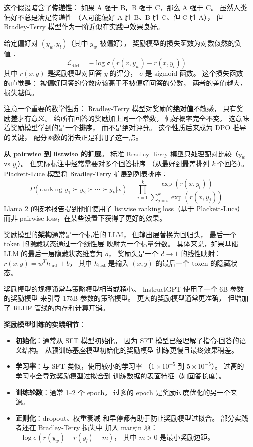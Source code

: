 这个假设暗含了\textbf{传递性}：
如果 A 强于 B，B 强于 C，那么 A 强于 C。
虽然人类偏好不总是满足传递性
（人可能偏好 A 胜 B、B 胜 C、但 C 胜 A），
但 Bradley-Terry 模型作为一阶近似在实践中效果良好。

给定偏好对 $(y_w, y_l)$（其中 $y_w$ 被偏好），
奖励模型的损失函数为对数似然的负值：
\begin{equation}
  \mathcal{L}_{\text{RM}} = -\log \sigma(r(x, y_w) - r(x, y_l))
  \label{eq:reward-model}
\end{equation}
其中 $r(x, y)$ 是奖励模型对回答 $y$ 的评分，
$\sigma$ 是 sigmoid 函数。
这个损失函数的直觉是：
被偏好回答的分数应该高于不被偏好回答的分数，
两者的差值越大，损失越低。

注意一个重要的数学性质：
Bradley-Terry 模型对奖励的\textbf{绝对值}不敏感，
只有奖励\textbf{差}才有意义。
给所有回答的奖励加上同一个常数，
偏好概率完全不变。
这意味着奖励模型学到的是一个\textbf{排序}，
而不是绝对评分。
这个性质后来成为 DPO 推导的关键，
配分函数的消去正是利用了这一点。

\textbf{从 pairwise 到 listwise 的扩展}。
标准 Bradley-Terry 模型只处理配对比较（$y_w$ vs $y_l$）。
但实际标注中经常需要对多个回答排序
（从最好到最差排列 $k$ 个回答）。
Plackett-Luce 模型将 Bradley-Terry 扩展到列表排序：
\begin{equation}
  P(\text{ranking } y_1 \succ y_2 \succ \cdots \succ y_k | x) =
  \prod_{i=1}^{k} \frac{\exp(r(x, y_i))}{\sum_{j=i}^{k} \exp(r(x, y_j))}
\end{equation}
Llama 2 的技术报告提到他们使用了
listwise ranking loss（基于 Plackett-Luce）
而非 pairwise loss，在某些设置下获得了更好的效果。

奖励模型的\textbf{架构}通常是一个标准的 LLM，
但输出层替换为回归头，
最后一个 token 的隐藏状态通过一个线性层
映射为一个标量分数。
具体来说，如果基础 LLM 的最后一层隐藏状态维度为 $d$，
奖励头是一个 $d \to 1$ 的线性映射：
$r(x, y) = w^T h_{\text{last}} + b$，
其中 $h_{\text{last}}$ 是输入 $(x, y)$ 的最后一个 token 的隐藏状态。

奖励模型的规模通常与策略模型相当或稍小。
InstructGPT 使用了一个 6B 参数的奖励模型
来引导 175B 参数的策略模型。
更大的奖励模型通常更准确，
但增加了 RLHF 管线的内存和计算开销。

\textbf{奖励模型训练的实践细节}：
\begin{itemize}[noitemsep]
  \item \textbf{初始化}：通常从 SFT 模型初始化，
        因为 SFT 模型已经理解了指令-回答的语义结构。
        从预训练基座模型初始化的奖励模型
        训练更慢且最终效果稍差。
  \item \textbf{学习率}：与 SFT 类似，使用较小的学习率
        （$1 \times 10^{-5}$ 到 $5 \times 10^{-5}$）。
        过高的学习率会导致奖励模型过拟合到
        训练数据的表面特征（如回答长度）。
  \item \textbf{训练轮数}：通常 1--2 个 epoch。
        过多的 epoch 是奖励过度优化的另一个来源。
  \item \textbf{正则化}：dropout、权重衰减
        和早停都有助于防止奖励模型过拟合。
        部分实践者还在 Bradley-Terry 损失中
        加入 margin 项：$-\log \sigma(r(y_w) - r(y_l) - m)$，
        其中 $m > 0$ 是最小奖励边距。
\end{itemize}

